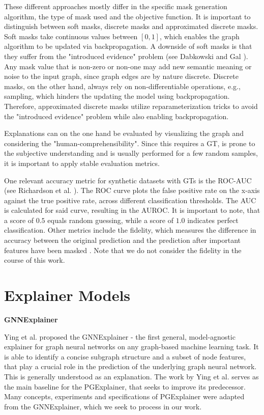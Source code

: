 These different approaches mostly differ in the specific mask generation algorithm, the type of mask used and the objective function. It is important to distinguish between soft masks, discrete masks and approximated discrete masks. Soft masks take continuous values between $[0,1]$, which enables the graph algorithm to be updated via backpropagation. A downside of soft masks is that they suffer from the "introduced evidence" problem (see Dabkowski and Gal \cite{dabkowski2017real}). Any mask value that is non-zero or non-one may add new semantic meaning or noise to the input graph, since graph edges are by nature discrete. Discrete masks, on the other hand, always rely on non-differentiable operations, e.g., sampling, which hinders the updating the model using backpropagation. Therefore, approximated discrete masks utilize reparameterization tricks to avoid the "introduced evidence" problem while also enabling backpropagation. \bigskip %

Explanations can on the one hand be evaluated by visualizing the graph and considering the "human-comprehensibility". Since this requires a \ac{GT}, is prone to the subjective understanding and is usually performed for a few random samples, it is important to apply stable evaluation metrics.

One relevant accuracy metric for synthetic datasets with \acp{GT} is the \ac{ROC-AUC} (see Richardson et al. \cite{RICHARDSON2024100994}). The \ac{ROC} curve plots the false positive rate on the x-axis against the true positive rate, across different classification thresholds. The \ac{AUC} is calculated for said curve, resulting in the AUROC. It is important to note, that a score of $0.5$ equals random guessing, while a score of $1.0$ indicates perfect classification. Other metrics include the fidelity, which measures the difference in accuracy between the original prediction and the prediction after important features have been masked \cite{yuan2022explainability}. Note that we do not consider the fidelity in the course of this work.


\section{Explainer Models}
\label{sec:Explainer_Models}

\textbf{GNNExplainer} \par
Ying et al. proposed the GNNExplainer \cite{ying2019gnnexplainer} - the first general, model-agnostic explainer for graph neural networks on any graph-based machine learning task. It is able to identify a concise subgraph structure and a subset of node features, that play a crucial role in the prediction of the underlying graph neural network. This is generally understood as an explanation. The work by Ying et al. serves as the main baseline for the PGExplainer, that seeks to improve its predecessor. Many concepts, experiments and specifications of PGExplainer were adapted from the GNNExplainer, which we seek to process in our work. \bigskip

